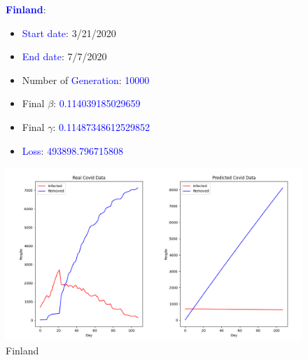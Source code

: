 \documentclass[a4paper]{article}
\begin{document}
    \begin{figure}[ht]
    \centering
    \textbf{\textcolor{blue}{Finland}}: 
    \begin{itemize}
        \item \textcolor{blue}{Start date}: 3/21/2020
        \item \textcolor{blue}{End date}: 7/7/2020
        \item Number of \textcolor{blue}{Generation}: \textcolor{blue}{10000}
        \item Final $\beta$: \textcolor{blue}{0.114039185029659}
        \item Final $\gamma$: \textcolor{blue}{0.11487348612529852}
        \item \textcolor{blue}{Loss}: \textcolor{blue}{493898.796715808}
    \end{itemize}
    
    \includegraphics[width= \linewidth]{ex5-plot/Finland.png}
    
    \caption{Finland}
    \end{figure}
    
\end{document}

